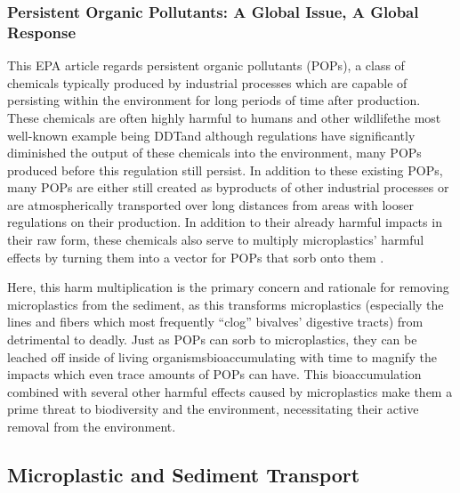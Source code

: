 \documentclass[fleqn,10pt]{SelfArx} %
\begin{document}
	
	\subsubsection*{Persistent Organic Pollutants: A Global Issue, A Global Response}
	This EPA article regards persistent organic pollutants (POPs), a class of chemicals typically produced by industrial processes which are capable of persisting within the environment for long periods of time after production. These chemicals are often highly harmful to humans and other wildlife\textemdash the most well-known example being DDT\textemdash and although regulations have significantly diminished the output of these chemicals into the environment, many POPs produced before this regulation still persist. In addition to these existing POPs, many POPs are either still created as byproducts of other industrial processes or are atmospherically transported over long distances from areas with looser regulations on their production. In addition to their already harmful impacts in their raw form, these chemicals also serve to multiply microplastics’ harmful effects by turning them into a vector for POPs that sorb onto them \cite{EPA}. 
	
	Here, this harm multiplication is the primary concern and rationale for removing microplastics from the sediment, as this transforms microplastics (especially the lines and fibers which most frequently “clog” bivalves’ digestive tracts) from detrimental to deadly. Just as POPs can sorb to microplastics, they can be leached off inside of living organisms\textemdash bioaccumulating with time to magnify the impacts which even trace amounts of POPs can have. This bioaccumulation combined with several other harmful effects caused by microplastics make them a prime threat to biodiversity and the environment, necessitating their active removal from the environment.
	
	
	\subsection{Microplastic and Sediment Transport}
\end{document}
